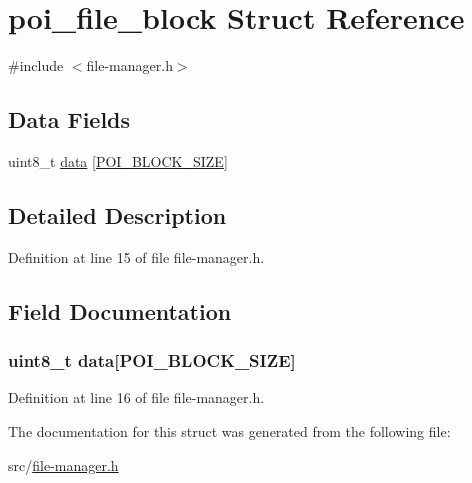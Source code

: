 \hypertarget{structpoi__file__block}{\section{poi\-\_\-file\-\_\-block Struct Reference}
\label{structpoi__file__block}
}


{\ttfamily \#include $<$file-\/manager.\-h$>$}

\subsection*{Data Fields}
\begin{DoxyCompactItemize}
\item 
uint8\-\_\-t \hyperlink{structpoi__file__block_a453580bb9858958a75d49cd9a450a4b3}{data} \mbox{[}\hyperlink{file-manager_8h_afb59af7070cf0cd010913eef940ffbbd}{P\-O\-I\-\_\-\-B\-L\-O\-C\-K\-\_\-\-S\-I\-Z\-E}\mbox{]}
\end{DoxyCompactItemize}


\subsection{Detailed Description}


Definition at line 15 of file file-\/manager.\-h.



\subsection{Field Documentation}
\hypertarget{structpoi__file__block_a453580bb9858958a75d49cd9a450a4b3}{
\subsubsection[{data}]{\setlength{\rightskip}{0pt plus 5cm}uint8\-\_\-t data\mbox{[}{\bf P\-O\-I\-\_\-\-B\-L\-O\-C\-K\-\_\-\-S\-I\-Z\-E}\mbox{]}}}\label{structpoi__file__block_a453580bb9858958a75d49cd9a450a4b3}


Definition at line 16 of file file-\/manager.\-h.



The documentation for this struct was generated from the following file\-:\begin{DoxyCompactItemize}
\item 
src/\hyperlink{file-manager_8h}{file-\/manager.\-h}\end{DoxyCompactItemize}
